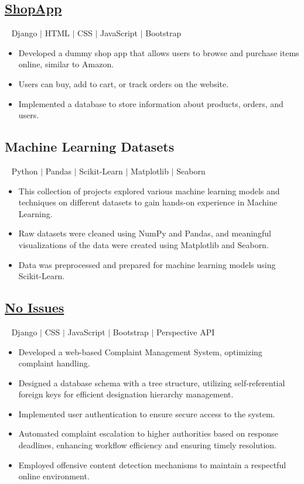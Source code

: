 \documentclass[12pt]{article}
\begin{document}
\subsection*{\href{https://akanksha2403.pythonanywhere.com/}{ShopApp}}~ Django $\vert$ HTML $\vert$ CSS $\vert$ JavaScript $\vert$ Bootstrap \\
\begin{itemize}[leftmargin=20px, topsep=0.5pt, itemsep=1.5pt, partopsep=0.5pt, parsep=0.5pt]
  \item Developed a dummy shop app that allows users to browse and purchase items online, similar to Amazon.
  \item Users can buy, add to cart, or track orders on the website.
  \item Implemented a database to store information about products, orders, and users.
\end{itemize}
\subsection*{Machine Learning Datasets}~ Python $\vert$ Pandas $\vert$ Scikit-Learn $\vert$ Matplotlib $\vert$ Seaborn \\
\begin{itemize}[leftmargin=20px, topsep=0.5pt, itemsep=1.5pt, partopsep=0.5pt, parsep=0.5pt]
  \item This collection of projects explored various machine learning models and techniques on different datasets to gain hands-on experience in Machine Learning.
  \item Raw datasets were cleaned using NumPy and Pandas, and meaningful visualizations of the data were created using Matplotlib and Seaborn.
  \item Data was preprocessed and prepared for machine learning models using Scikit-Learn.
\end{itemize}

\subsection*{\href{https://github.com/Akanksha2403/no_issues}{No Issues}}~ Django $\vert$ CSS $\vert$ JavaScript $\vert$ Bootstrap $\vert$ Perspective API \\
\begin{itemize}[leftmargin=20px, topsep=1pt, itemsep=1.5pt, partopsep=1pt, parsep=1pt]
	\item Developed a web-based Complaint Management System, optimizing complaint handling.
	\item Designed a database schema with a tree structure, utilizing self-referential foreign keys for efficient designation hierarchy management.
  \item Implemented user authentication to ensure secure access to the system.
  \item Automated complaint escalation to higher authorities based on response deadlines, enhancing workflow efficiency and ensuring timely resolution.
  \item Employed offensive content detection mechanisms to maintain a respectful online environment.
\end{itemize}
\end{document}
